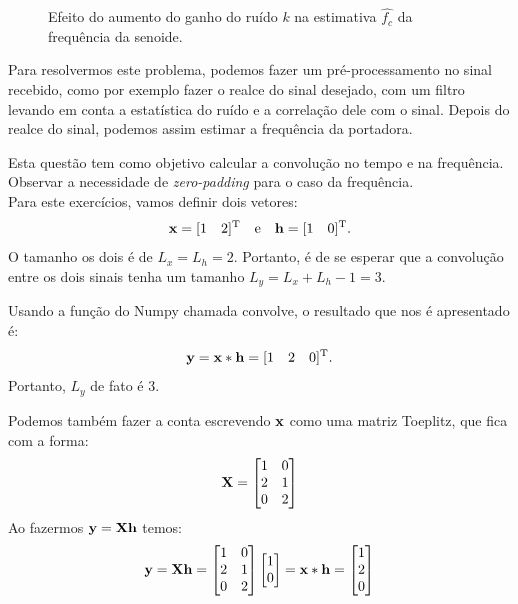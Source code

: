 \documentclass{homeworkclass}
\begin{document}
\begin{homeworkProblem}
\begin{figure}[!h]
		\caption{Efeito do aumento do ganho do ruído $k$ na estimativa $\hat{f_c}$ da frequência da senoide.}
		\label{fig:ruidera}
	\end{figure}

	Para resolvermos este problema, podemos fazer um pré-processamento no sinal recebido, como por exemplo fazer o realce do sinal desejado, com um filtro levando em conta a estatística do ruído e a correlação dele com o sinal. Depois do realce do sinal, podemos assim estimar a frequência da portadora.
	
\end{homeworkProblem}

\cleardoublepage
\begin{homeworkProblem}
	
	Esta questão tem como objetivo calcular a convolução no tempo e na frequência. Observar a necessidade de \textit{zero-padding} para o caso da frequência. \\
	
	Para este exercícios, vamos definir dois vetores:
	\begin{equation*}
	\mathbf{x} = [1 \quad 2]^{\mathrm{T}} \quad \textrm{e} \quad
	\mathbf{h} = [1 \quad 0]^{\mathrm{T}}.
	\end{equation*}
	O tamanho os dois é de $L_{x} = L_{h} = 2$. Portanto, é de se esperar que a convolução entre os dois sinais tenha um tamanho $L_{y} = L_{x} + L_{h} - 1 = 3$.
	
	Usando a função do Numpy chamada convolve, o resultado que nos é apresentado é:
	\begin{equation*}
	\mathbf{y} = \mathbf{x} * \mathbf{h} = [1 \quad 2 \quad 0]^{\mathrm{T}}. 
	\end{equation*}
	Portanto, $L_{y}$ de fato é 3.
	
	Podemos também fazer a conta escrevendo $\mathbf{x}$ como uma matriz Toeplitz, que fica com a forma:
	\begin{equation*} \mathbf{X} = 
	\begin{bmatrix}
	1 & 0 \\ 
	2 & 1 \\ 
	0 & 2
	\end{bmatrix} 
	\end{equation*}
	Ao fazermos $\mathbf{y} = \mathbf{X}\mathbf{h}$ temos:
	\begin{equation*}
	\mathbf{y} = \mathbf{X}\mathbf{h} = 	\begin{bmatrix}
	1 & 0 \\ 
	2 & 1 \\ 
	0 & 2
	\end{bmatrix} 	\begin{bmatrix}
	1  \\ 
	0	\end{bmatrix} = \mathbf{x} * \mathbf{h} = \begin{bmatrix}
	1 \\ 
	2 \\ 
	0 
	\end{bmatrix} 
	\end{equation*}
	

\end{homeworkProblem}
\end{document}
